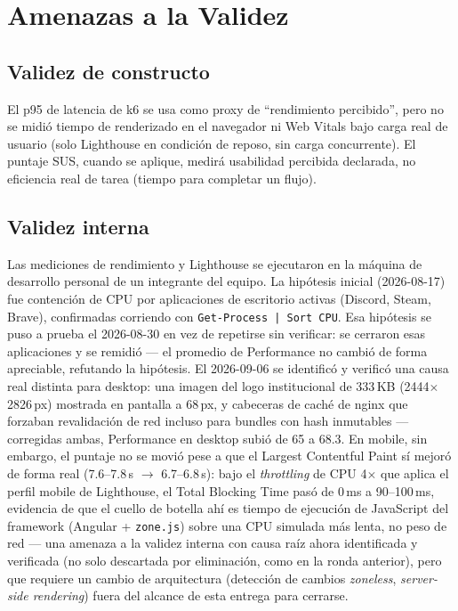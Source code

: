 \section{Amenazas a la Validez}
\label{sec:amenazas-validez}

\subsection{Validez de constructo}
El p95 de latencia de k6 se usa como proxy de ``rendimiento percibido'', pero no se midió tiempo de
renderizado en el navegador ni Web Vitals bajo carga real de usuario (solo Lighthouse en condición de
reposo, sin carga concurrente). El puntaje SUS, cuando se aplique, medirá usabilidad percibida
declarada, no eficiencia real de tarea (tiempo para completar un flujo).

\subsection{Validez interna}
Las mediciones de rendimiento y Lighthouse se ejecutaron en la máquina de desarrollo personal de un
integrante del equipo. La hipótesis inicial (2026-08-17) fue contención de CPU por aplicaciones de
escritorio activas (Discord, Steam, Brave), confirmadas corriendo con \texttt{Get-Process | Sort CPU}.
Esa hipótesis se puso a prueba el 2026-08-30 en vez de repetirse sin verificar: se cerraron esas
aplicaciones y se remidió --- el promedio de Performance no cambió de forma apreciable, refutando la
hipótesis. El 2026-09-06 se identificó y verificó una causa real distinta para desktop: una imagen del
logo institucional de 333\,KB (2444$\times$2826\,px) mostrada en pantalla a 68\,px, y cabeceras de caché
de nginx que forzaban revalidación de red incluso para bundles con hash inmutables --- corregidas ambas,
Performance en desktop subió de 65 a 68.3. En mobile, sin embargo, el puntaje no se movió pese a que el
Largest Contentful Paint sí mejoró de forma real (7.6--7.8\,s $\to$ 6.7--6.8\,s): bajo el
\emph{throttling} de CPU 4$\times$ que aplica el perfil mobile de Lighthouse, el Total Blocking Time pasó
de 0\,ms a 90--100\,ms, evidencia de que el cuello de botella ahí es tiempo de ejecución de JavaScript del
framework (Angular + \texttt{zone.js}) sobre una CPU simulada más lenta, no peso de red --- una amenaza a
la validez interna con causa raíz ahora identificada y verificada (no solo descartada por eliminación,
como en la ronda anterior), pero que requiere un cambio de arquitectura (detección de cambios
\emph{zoneless}, \emph{server-side rendering}) fuera del alcance de esta entrega para cerrarse.

